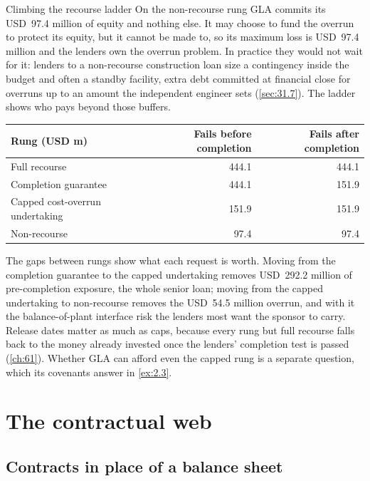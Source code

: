 \begin{example}{Climbing the recourse ladder \illustrative}
On the non-recourse rung GLA commits its USD~97.4 million of equity and nothing else. It may choose to fund the overrun to protect its equity, but it cannot be made to, so its maximum loss is USD~97.4 million and the lenders own the overrun problem. In practice they would not wait for it: lenders to a non-recourse construction loan size a contingency inside the budget and often a standby facility, extra debt committed at financial close for overruns up to an amount the independent engineer sets (\cref{sec:31.7}). The ladder shows who pays beyond those buffers.

\begin{center}
\begin{tabularx}{\linewidth}{@{}L rr@{}}
\toprule
Rung (USD m) & Fails before completion & Fails after completion\\
\midrule
Full recourse & 444.1 & 444.1\\
Completion guarantee & 444.1 & 151.9\\
Capped cost-overrun undertaking & 151.9 & 151.9\\
Non-recourse & 97.4 & 97.4\\
\bottomrule
\end{tabularx}
\end{center}

The gaps between rungs show what each request is worth. Moving from the completion guarantee to the capped undertaking removes USD~292.2 million of pre-completion exposure, the whole senior loan; moving from the capped undertaking to non-recourse removes the USD~54.5 million overrun, and with it the balance-of-plant interface risk the lenders most want the sponsor to carry. Release dates matter as much as caps, because every rung but full recourse falls back to the money already invested once the lenders' completion test is passed (\cref{ch:61}). Whether GLA can afford even the capped rung is a separate question, which its covenants answer in \cref{ex:2.3}.
\end{example}

\section{The contractual web}\label{sec:2.3}

\subsection{Contracts in place of a balance sheet}\label{ssec:2.3.1}

